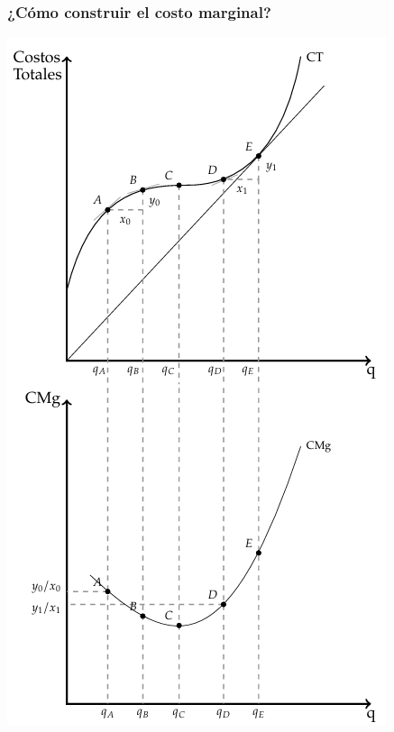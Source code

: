 \documentclass{beamer}
\begin{document}
\begin{frame}
\frametitle{¿Cómo construir el costo marginal?}
\centering
\includegraphics[scale=0.5]{../Figures/C13.7.png}
\end{frame}
\end{document}

